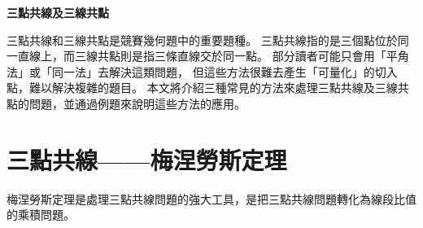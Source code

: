 \documentclass[12pt]{article}
\begin{document}
\thispagestyle{fancy}  %
\begin{center}
    \textbf{\Large{三點共線及三線共點}}
\end{center}
三點共線和三線共點是競賽幾何題中的重要題種。
三點共線指的是三個點位於同一直線上，而三線共點則是指三條直線交於同一點。
部分讀者可能只會用「平角法」或「同一法」去解決這類問題，
但這些方法很難去產生「可量化」的切入點，難以解決複雜的題目。
本文將介紹三種常見的方法來處理三點共線及三線共點的問題，並通過例題來說明這些方法的應用。
\section{三點共線——梅涅勞斯定理}
梅涅勞斯定理是處理三點共線問題的強大工具，是把三點共線問題轉化為線段比值的乘積問題。
\end{document}
